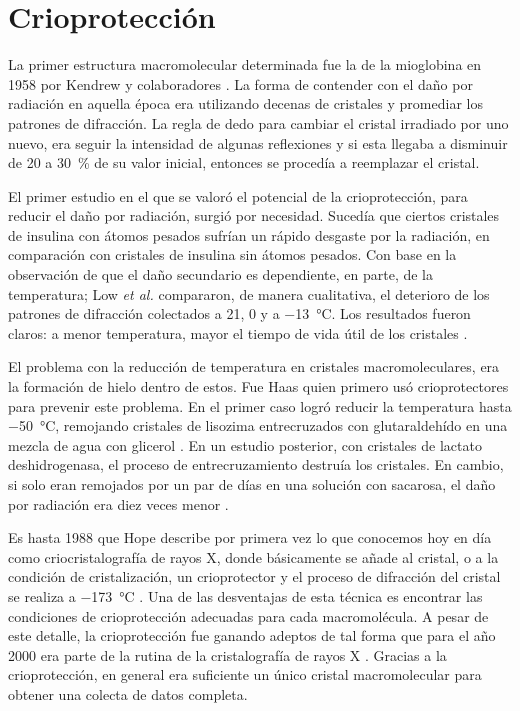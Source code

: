 \section{Crioprotección}
La primer estructura macromolecular determinada fue la de la mioglobina en 1958 por Kendrew y colaboradores . La forma de contender con el daño por radiación en aquella época era utilizando decenas de cristales y promediar los patrones de difracción. La regla de dedo para cambiar el cristal irradiado por uno nuevo, era seguir la intensidad de algunas reflexiones y si esta llegaba a disminuir de \num{20} a \SI{30}{\percent} de su valor inicial, entonces se procedía a reemplazar el cristal. 

El primer estudio en el que se valoró el potencial de la crioprotección, para reducir el daño por radiación, surgió por necesidad. Sucedía que ciertos cristales de insulina con átomos pesados sufrían un rápido desgaste por la radiación, en comparación con cristales de insulina sin átomos pesados. Con base en la observación de que el daño secundario es dependiente, en parte, de la temperatura; Low \emph{et al.} compararon, de manera cualitativa, el deterioro de los patrones de difracción colectados a \num{21}, \num{0} y a \SI{-13}{\celsius}. Los resultados fueron claros: a menor temperatura, mayor el tiempo de vida útil de los cristales  . 

El problema con la reducción de temperatura en cristales macromoleculares, era la formación de hielo dentro de estos. Fue Haas quien primero usó crioprotectores para prevenir este problema. En el primer caso logró reducir la temperatura hasta \SI{-50}{\celsius}, remojando cristales de lisozima entrecruzados con glutaraldehído
en una mezcla de agua con glicerol . En un estudio posterior, con cristales de lactato deshidrogenasa, el proceso de entrecruzamiento destruía los cristales. En cambio, si solo eran remojados por un par de días en una solución con sacarosa, el daño por radiación era diez veces menor . 

Es hasta 1988 que Hope describe por primera vez lo que conocemos hoy en día como criocristalografía de rayos X, donde básicamente se añade al cristal, o a la condición de cristalización, un crioprotector y el proceso de difracción del cristal se realiza a \SI{-173}{\celsius} . Una de las desventajas de esta técnica es encontrar las condiciones de crioprotección adecuadas para cada macromolécula. A pesar de este detalle, la crioprotección fue ganando adeptos de tal forma
que para el año 2000 era parte de la rutina de la cristalografía de rayos X . Gracias a la crioprotección, en general era suficiente un único cristal macromolecular para obtener una colecta de datos completa.


